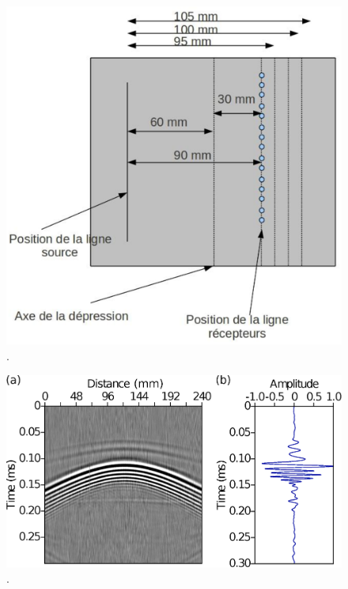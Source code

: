 \documentclass[manuscript,revised]{geophysics}
\begin{document}
\begin{figure}[!h]
	\centering
	\includegraphics[scale=0.4]{fig/amplitude_acqui_principle.eps}
	\caption{.}
	\label{amplitude_acqui_principle}
\end{figure}

\begin{figure}[!h]
	\centering
	\includegraphics[scale=0.4]{fig/amplitude_stack_principle.eps}
	\caption{.}
	\label{amplitude_stack_principle}
\end{figure}
\end{document}
